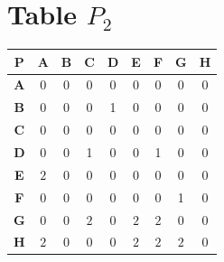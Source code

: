 \documentclass{article}
\begin{document}
\section{Table $P_{2}$}
\begin{center}
    \begin{tabular}{|c||c|c|c|c|c|c|c|c|}
        \hline
        \textbf{P} & \textbf{A} & \textbf{B} & \textbf{C} & \textbf{D} & \textbf{E} & \textbf{F} & \textbf{G} & \textbf{H} \\
        \hline
        \hline
        \textbf{A}& 0 & 0 & 0 & 0 & 0 & 0 & 0 & 0 \\
        \hline
        \textbf{B}& 0 & 0 & 0 & 1 & 0 & 0 & 0 & 0 \\
        \hline
        \textbf{C}& 0 & 0 & 0 & 0 & 0 & 0 & 0 & 0 \\
        \hline
        \textbf{D}& 0 & 0 & 1 & 0 & 0 & 1 & 0 & 0 \\
        \hline
        \textbf{E}& \cellcolor[HTML]{D74894}$2$ & 0 & 0 & 0 & 0 & 0 & 0 & 0 \\
        \hline
        \textbf{F}& 0 & 0 & 0 & 0 & 0 & 0 & 1 & 0 \\
        \hline
        \textbf{G}& 0 & 0 & \cellcolor[HTML]{D74894}$2$ & 0 & \cellcolor[HTML]{D74894}$2$ & \cellcolor[HTML]{D74894}$2$ & 0 & 0 \\
        \hline
        \textbf{H}& \cellcolor[HTML]{D74894}$2$ & 0 & 0 & 0 & \cellcolor[HTML]{D74894}$2$ & \cellcolor[HTML]{D74894}$2$ & \cellcolor[HTML]{D74894}$2$ & 0 \\
        \hline
    \end{tabular}
\end{center}
\end{document}
